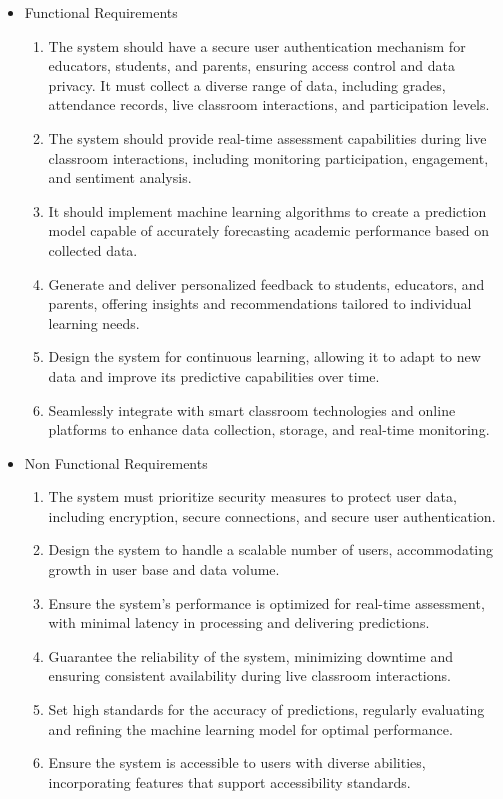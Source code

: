 \begin{itemize}
    \item Functional Requirements
    \begin{enumerate}
      \item The system should have a secure user authentication mechanism for educators, students, and parents, ensuring access control and data privacy. It must collect a diverse range of data, including grades, attendance records, live classroom interactions, and participation levels.
    \item The system should provide real-time assessment capabilities during live classroom interactions, including monitoring participation, engagement, and sentiment analysis.
    \item It should implement machine learning algorithms to create a prediction model capable of accurately forecasting academic performance based on collected data.
    \item Generate and deliver personalized feedback to students, educators, and parents, offering insights and recommendations tailored to individual learning needs.
    \item Design the system for continuous learning, allowing it to adapt to new data and improve its predictive capabilities over time.
    \item Seamlessly integrate with smart classroom technologies and online platforms to enhance data collection, storage, and real-time monitoring.
    \end{enumerate}
\end{itemize}

\begin{itemize}
    \item Non Functional Requirements
    \begin{enumerate}
        \item The system must prioritize security measures to protect user data, including encryption, secure connections, and secure user authentication.
    \item Design the system to handle a scalable number of users, accommodating growth in user base and data volume.
    \item Ensure the system's performance is optimized for real-time assessment, with minimal latency in processing and delivering predictions.
    \item Guarantee the reliability of the system, minimizing downtime and ensuring consistent availability during live classroom interactions.
    \item Set high standards for the accuracy of predictions, regularly evaluating and refining the machine learning model for optimal performance.
    \item Ensure the system is accessible to users with diverse abilities, incorporating features that support accessibility standards.
    \end{enumerate}
\end{itemize}

